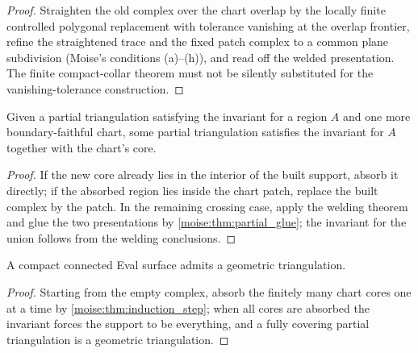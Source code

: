 \begin{proof}
\leanok
Straighten the old complex over the chart overlap by the locally finite
controlled polygonal replacement with tolerance vanishing at the overlap
frontier, refine the straightened trace and the fixed patch complex to a
common plane subdivision (Moise's conditions (a)--(h)), and read off the
welded presentation.  The finite compact-collar theorem must not be silently
substituted for the vanishing-tolerance construction.
\end{proof}

\begin{theorem}
\label{moise:thm:induction_step}
\leanok
{}
Given a partial triangulation satisfying the invariant for a region $A$ and one
more boundary-faithful chart, some partial triangulation satisfies the
invariant for $A$ together with the chart's core.
\end{theorem}

\begin{proof}
\leanok
If the new core already lies in the interior of the built support, absorb it
directly; if the absorbed region lies inside the chart patch, replace the
built complex by the patch.  In the remaining crossing case, apply the welding
theorem and glue the two presentations by \ref{moise:thm:partial_glue}; the
invariant for the union follows from the welding conclusions.
\end{proof}

\begin{theorem}
\label{moise:thm:rado_assembly}
\leanok
{}
A compact connected Eval surface admits a geometric triangulation.
\end{theorem}

\begin{proof}
\leanok
Starting from the empty complex, absorb the finitely many chart cores one at a
time by \ref{moise:thm:induction_step}; when all cores are absorbed the
invariant forces the support to be everything, and a fully covering partial
triangulation is a geometric triangulation.
\end{proof}

